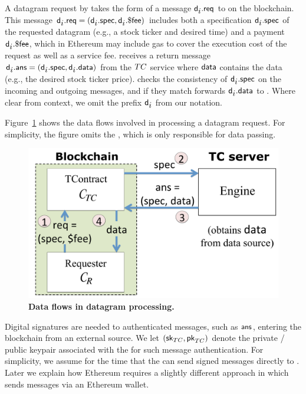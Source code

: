 A datagram request by \reqcont takes the form of a message ${\sf d_{\mbox{$i$}}}.{\sf req}$ to \tcont on the blockchain. This message ${\sf d_{\mbox{$i$}}}.{\sf req} = ({\sf d_{\mbox{$i$}}}.{\sf spec}, {\sf d_{\mbox{$i$}}}.{\sf \$fee})$ includes both a specification ${\sf d_{\mbox{$i$}}}.{\sf spec}$ of the requested datagram (e.g., a stock ticker and desired time) and a payment ${\sf d_{\mbox{$i$}}}.{\sf \$fee}$, which in Ethereum may include gas to cover the execution cost of the request as well as a service fee. \tcont receives a return message ${\sf d_{\mbox{$i$}}}.{\sf ans} = ({\sf d_{\mbox{$i$}}}.{\sf spec}, {\sf d_{\mbox{$i$}}}.{\sf data})$ from the $TC$ service where ${\sf data}$ contains the data (e.g., the desired stock ticker price). \tcont checks the consistency of ${\sf d_{\mbox{$i$}}}.{\sf spec}$ on the incoming and outgoing messages, and if they match forwards ${\sf d_{\mbox{$i$}}}.{\sf data}$ to \reqcont. Where clear from context, we omit the prefix ${\sf d_{\mbox{$i$}}}$ from our notation.

Figure~\ref{fig:dataflow} shows the data flows involved in processing a datagram request. For simplicity, the figure omits the \medname, which is only responsible for data passing.


\begin{figure}[h!]
\centering
\includegraphics[width=\columnwidth]{figures/DataflowFig}
\caption{{\bf Data flows in datagram processing.}}
\label{fig:dataflow}
\end{figure}


Digital signatures are needed to authenticated messages, such as ${\sf ans}$, entering the blockchain from an external source. We let $({{\sf sk}_{TC}}, {\sf pk}_{TC})$ denote the private / public keypair associated with the \encname for such message authentication. For simplicity, we assume for the time that the \encname can send signed messages directly to \tcont. Later we explain how Ethereum requires a slightly different approach in which \tc sends messages via an Ethereum wallet.


